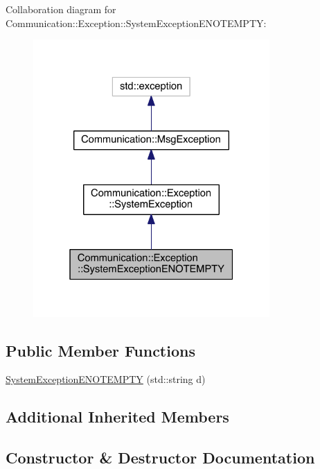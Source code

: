 Collaboration diagram for Communication\+:\+:Exception\+:\+:System\+Exception\+E\+N\+O\+T\+E\+M\+P\+T\+Y\+:\nopagebreak
\begin{figure}[H]
\begin{center}
\leavevmode
\includegraphics[width=256pt]{class_communication_1_1_exception_1_1_system_exception_e_n_o_t_e_m_p_t_y__coll__graph}
\end{center}
\end{figure}
\subsection*{Public Member Functions}
\begin{DoxyCompactItemize}
\item 
\hyperlink{class_communication_1_1_exception_1_1_system_exception_e_n_o_t_e_m_p_t_y_acf0a4204042a712f43cb1db57dbefbed}{System\+Exception\+E\+N\+O\+T\+E\+M\+P\+T\+Y} (std\+::string d)
\end{DoxyCompactItemize}
\subsection*{Additional Inherited Members}


\subsection{Constructor \& Destructor Documentation}
\hypertarget{class_communication_1_1_exception_1_1_system_exception_e_n_o_t_e_m_p_t_y_acf0a4204042a712f43cb1db57dbefbed}{}
